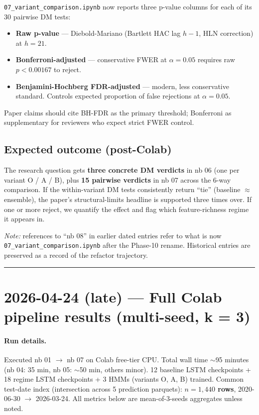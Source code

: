 \documentclass[11pt]{article}
\begin{document}
\texttt{07\_variant\_comparison.ipynb} now reports three p-value columns for each of its 30 pairwise DM tests:

\begin{itemize}[leftmargin=*]
  \item \textbf{Raw p-value} --- Diebold-Mariano (Bartlett HAC lag $h-1$, HLN correction) at $h = 21$.
  \item \textbf{Bonferroni-adjusted} --- conservative FWER at $\alpha=0.05$ requires raw $p < 0.00167$ to reject.
  \item \textbf{Benjamini-Hochberg FDR-adjusted} --- modern, less conservative standard. Controls expected proportion of false rejections at $\alpha=0.05$.
\end{itemize}

Paper claims should cite BH-FDR as the primary threshold; Bonferroni as supplementary for reviewers who expect strict FWER control.

\subsection*{Expected outcome (post-Colab)}

The research question gets \textbf{three concrete DM verdicts} in nb 06 (one per variant O / A / B), plus \textbf{15 pairwise verdicts} in nb 07 across the 6-way comparison. If the within-variant DM tests consistently return ``tie'' (baseline $\approx$ ensemble), the paper's structural-limits headline is supported three times over. If one or more reject, we quantify the effect and flag which feature-richness regime it appears in.

\emph{Note:} references to ``nb 08'' in earlier dated entries refer to what is now \texttt{07\_variant\_comparison.ipynb} after the Phase-10 rename. Historical entries are preserved as a record of the refactor trajectory.

\vspace{1em}
\hrule
\vspace{1em}

\section*{2026-04-24 (late) --- Full Colab pipeline results (multi-seed, k = 3)}

\paragraph{Run details.} Executed nb 01 $\to$ nb 07 on Colab free-tier CPU. Total wall time $\sim$95 minutes (nb 04: 35 min, nb 05: $\sim$50 min, others minor). 12 baseline LSTM checkpoints + 18 regime LSTM checkpoints + 3 HMMs (variants O, A, B) trained. Common test-date index (intersection across 5 prediction parquets): \textbf{$n = 1{,}440$ rows}, 2020-06-30 $\to$ 2026-03-24. All metrics below are mean-of-3-seeds aggregates unless noted.
\end{document}
